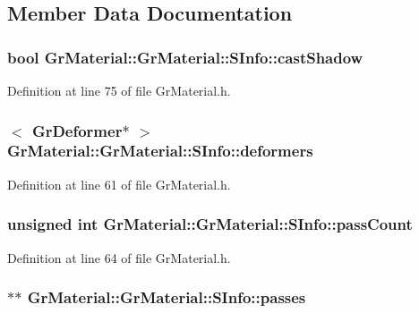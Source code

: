 \subsection{Member Data Documentation}
\hypertarget{struct_gr_material_1_1_s_info_f18b720a0aad7eae7be10f3b0622bd77}{
\subsubsection[{castShadow}]{\setlength{\rightskip}{0pt plus 5cm}bool GrMaterial::GrMaterial::SInfo::castShadow}}
\label{struct_gr_material_1_1_s_info_f18b720a0aad7eae7be10f3b0622bd77}




Definition at line 75 of file GrMaterial.h.\hypertarget{struct_gr_material_1_1_s_info_96cb5400adfde62d6b3580ff930012ef}{
\subsubsection[{deformers}]{$<$ {\bf GrDeformer}$\ast$ $>$ GrMaterial::GrMaterial::SInfo::deformers}}
\label{struct_gr_material_1_1_s_info_96cb5400adfde62d6b3580ff930012ef}




Definition at line 61 of file GrMaterial.h.\hypertarget{struct_gr_material_1_1_s_info_d582f630813982a1a364956aa804ca82}{
\subsubsection[{passCount}]{\setlength{\rightskip}{0pt plus 5cm}unsigned int GrMaterial::GrMaterial::SInfo::passCount}}
\label{struct_gr_material_1_1_s_info_d582f630813982a1a364956aa804ca82}




Definition at line 64 of file GrMaterial.h.\hypertarget{struct_gr_material_1_1_s_info_65b4844858083fced789f35b812d43a8}{
\subsubsection[{passes}]{$\ast$$\ast$ GrMaterial::GrMaterial::SInfo::passes}}
\label{struct_gr_material_1_1_s_info_65b4844858083fced789f35b812d43a8}




